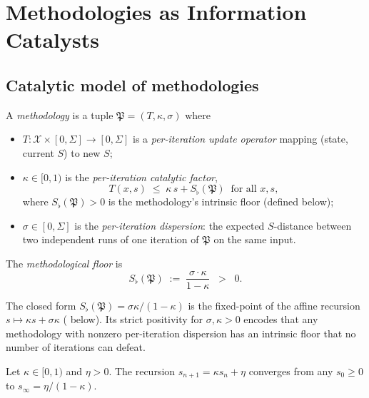 \documentclass[twocolumn,11pt,a4paper]{article}
\newcommand{\X}{\mathcal{X}}
\newcommand{\Method}{\mathfrak{P}}
\newcommand{\Sfloor}{S_{\flat}}
\begin{document}
\section{Methodologies as Information Catalysts}
\label{sec:methodology}

\subsection{Catalytic model of methodologies}

\begin{definition}[Methodology]\label{def:method}
A \emph{methodology} is a tuple $\Method=(T,\kappa,\sigma)$ where
\begin{itemize}[leftmargin=*]
\item $T:\X\times[0,\Sigma]\to[0,\Sigma]$ is a \emph{per-iteration update
operator} mapping (state, current $S$) to new $S$;
\item $\kappa\in[0,1)$ is the \emph{per-iteration catalytic factor},
\[
T(x,s)\;\le\;\kappa\,s+\Sfloor(\Method)\;\;\text{for all }x,s,
\]
where $\Sfloor(\Method)>0$ is the methodology's intrinsic floor (defined
below);
\item $\sigma\in[0,\Sigma]$ is the \emph{per-iteration dispersion}: the
expected $S$-distance between two independent runs of one iteration of
$\Method$ on the same input.
\end{itemize}
The \emph{methodological floor} is
\[
\Sfloor(\Method)\;:=\;\frac{\sigma\cdot\kappa}{1-\kappa}\;\;>\;\;0.
\]
\end{definition}

\begin{remark}\label{rem:why-this-floor}
The closed form $\Sfloor(\Method)=\sigma\kappa/(1-\kappa)$ is the
fixed-point of the affine recursion $s\mapsto\kappa s+\sigma\kappa$
( below). Its strict positivity for $\sigma,\kappa>0$
encodes that any methodology with nonzero per-iteration dispersion has an
intrinsic floor that no number of iterations can defeat.
\end{remark}

\begin{lemma}\label{lem:fixed-point}
Let $\kappa\in[0,1)$ and $\eta>0$. The recursion
$s_{n+1}=\kappa s_n+\eta$ converges from any $s_0\ge 0$ to
$s_\infty=\eta/(1-\kappa)$.
\end{lemma}
\end{document}

